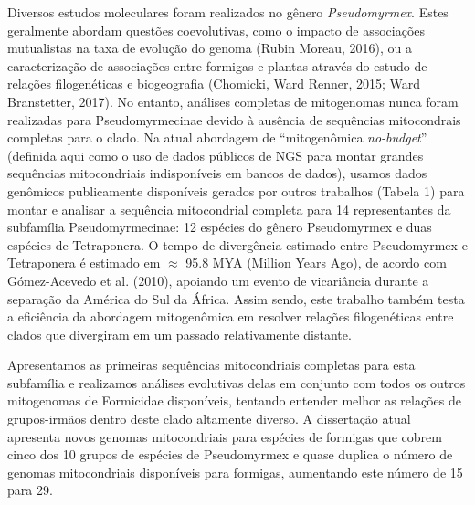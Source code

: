\documentclass[../DISSERTACAO_MAIN.tex]{subfiles}
\begin{document}
Diversos estudos moleculares foram realizados no gênero \textit{Pseudomyrmex}. Estes geralmente abordam questões coevolutivas, como o impacto de associações mutualistas na taxa de evolução do genoma (Rubin  Moreau, 2016), ou a caracterização de associações entre formigas e plantas através do estudo de relações filogenéticas e biogeografia (Chomicki, Ward  Renner, 2015; Ward  Branstetter, 2017). No entanto, análises completas de mitogenomas nunca foram realizadas para Pseudomyrmecinae devido à ausência de sequências mitocondrais completas para o clado. Na atual abordagem de “mitogenômica \textit{no-budget}” (definida aqui como o uso de dados públicos de NGS para montar grandes sequências mitocondriais indisponíveis em bancos de dados), usamos dados genômicos publicamente disponíveis gerados por outros trabalhos (Tabela 1) para montar e analisar a sequência mitocondrial completa para 14 representantes da subfamília Pseudomyrmecinae: 12 espécies do gênero Pseudomyrmex e duas espécies de Tetraponera. O tempo de divergência estimado entre Pseudomyrmex e Tetraponera é estimado em $\approx$ 95.8 MYA (Million Years Ago), de acordo com Gómez-Acevedo et al. (2010), apoiando um evento de vicariância durante a separação da América do Sul da África. Assim sendo, este trabalho também testa a eficiência da abordagem mitogenômica em resolver relações filogenéticas entre clados que divergiram em um passado relativamente distante.

Apresentamos as primeiras sequências mitocondriais completas para esta subfamília e realizamos análises evolutivas delas em conjunto com todos os outros mitogenomas de Formicidae disponíveis, tentando entender melhor as relações de grupos-irmãos dentro deste clado altamente diverso. A dissertação atual apresenta novos genomas mitocondriais para espécies de formigas que cobrem cinco dos 10 grupos de espécies de Pseudomyrmex e quase duplica o número de genomas mitocondriais disponíveis para formigas, aumentando este número de 15 para 29.
\end{document}
